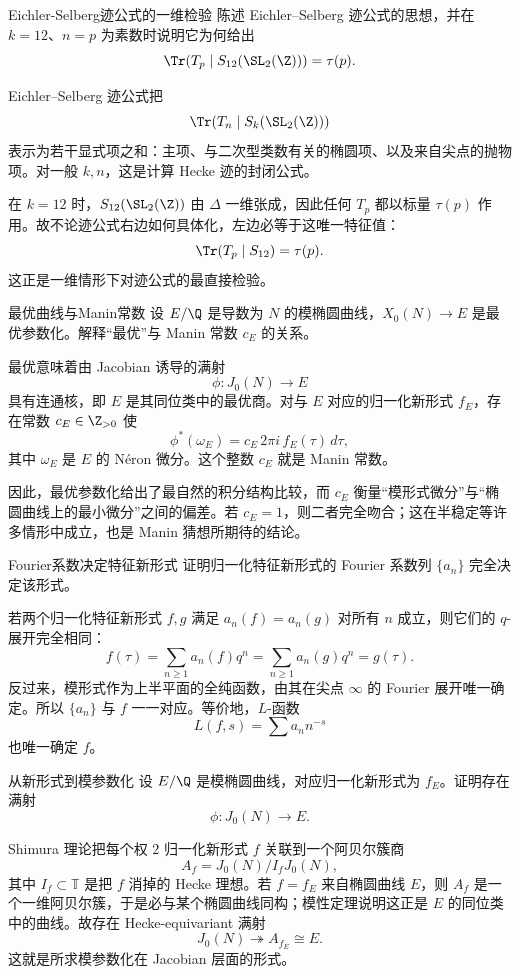\begin{problem}{Eichler-Selberg迹公式的一维检验}
陈述 Eichler--Selberg 迹公式的思想，并在 $k=12$、$n=p$ 为素数时说明它为何给出
\[
\Tr(T_p\mid S_{12}(\SL_2(\Z)))=\tau(p).
\]
\end{problem}
\begin{solution}
Eichler--Selberg 迹公式把
\[
\Tr(T_n\mid S_k(\SL_2(\Z)))
\]
表示为若干显式项之和：主项、与二次型类数有关的椭圆项、以及来自尖点的抛物项。对一般 $k,n$，这是计算 Hecke 迹的封闭公式。

在 $k=12$ 时，$S_{12}(\SL_2(\Z))$ 由 $\Delta$ 一维张成，因此任何 $T_p$ 都以标量 $\tau(p)$ 作用。故不论迹公式右边如何具体化，左边必等于这唯一特征值：
\[
\Tr(T_p\mid S_{12})=\tau(p).
\]
这正是一维情形下对迹公式的最直接检验。
\end{solution}

\begin{problem}{最优曲线与Manin常数}
设 $E/\Q$ 是导数为 $N$ 的模椭圆曲线，$X_0(N)\to E$ 是最优参数化。解释“最优”与 Manin 常数 $c_E$ 的关系。
\end{problem}
\begin{solution}
最优意味着由 Jacobian 诱导的满射
\[
\phi:J_0(N)\to E
\]
具有连通核，即 $E$ 是其同位类中的最优商。对与 $E$ 对应的归一化新形式 $f_E$，存在常数 $c_E\in\Z_{>0}$ 使
\[
\phi^*(\omega_E)=c_E\,2\pi i\,f_E(\tau)\,d\tau,
\]
其中 $\omega_E$ 是 $E$ 的 N\'eron 微分。这个整数 $c_E$ 就是 Manin 常数。

因此，最优参数化给出了最自然的积分结构比较，而 $c_E$ 衡量“模形式微分”与“椭圆曲线上的最小微分”之间的偏差。若 $c_E=1$，则二者完全吻合；这在半稳定等许多情形中成立，也是 Manin 猜想所期待的结论。
\end{solution}

\begin{problem}{Fourier系数决定特征新形式}
证明归一化特征新形式的 Fourier 系数列 $\{a_n\}$ 完全决定该形式。
\end{problem}
\begin{solution}
若两个归一化特征新形式 $f,g$ 满足 $a_n(f)=a_n(g)$ 对所有 $n$ 成立，则它们的 $q$-展开完全相同：
\[
f(\tau)=\sum_{n\ge1}a_n(f)q^n=\sum_{n\ge1}a_n(g)q^n=g(\tau).
\]
反过来，模形式作为上半平面的全纯函数，由其在尖点 $\infty$ 的 Fourier 展开唯一确定。所以 $\{a_n\}$ 与 $f$ 一一对应。等价地，$L$-函数
\[
L(f,s)=\sum a_nn^{-s}
\]
也唯一确定 $f$。
\end{solution}

\begin{problem}{从新形式到模参数化}
设 $E/\Q$ 是模椭圆曲线，对应归一化新形式为 $f_E$。证明存在满射
\[
\phi:J_0(N)\to E.
\]
\end{problem}
\begin{solution}
Shimura 理论把每个权 $2$ 归一化新形式 $f$ 关联到一个阿贝尔簇商
\[
A_f=J_0(N)/I_fJ_0(N),
\]
其中 $I_f\subset\mathbb{T}$ 是把 $f$ 消掉的 Hecke 理想。若 $f=f_E$ 来自椭圆曲线 $E$，则 $A_f$ 是一个一维阿贝尔簇，于是必与某个椭圆曲线同构；模性定理说明这正是 $E$ 的同位类中的曲线。故存在 Hecke-equivariant 满射
\[
J_0(N)\twoheadrightarrow A_{f_E}\cong E.
\]
这就是所求模参数化在 Jacobian 层面的形式。
\end{solution}
